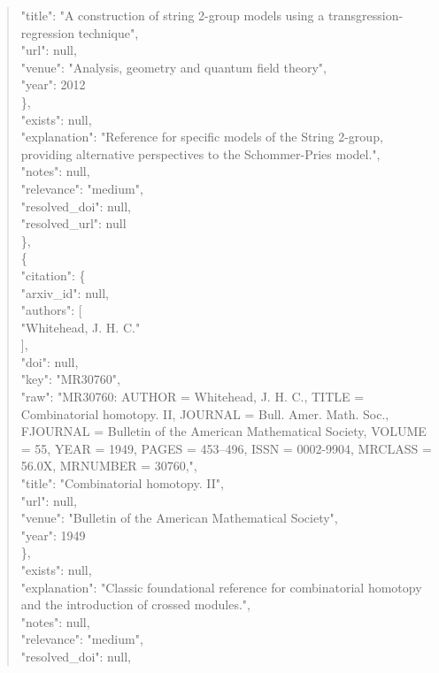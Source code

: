 \documentclass[11pt]{article}
\begin{document}
\begin{quote}
        "title": "A construction of string 2-group models using a transgression-regression technique",\\
        "url": null,\\
        "venue": "Analysis, geometry and quantum field theory",\\
        "year": 2012\\
      \},\\
      "exists": null,\\
      "explanation": "Reference for specific models of the String 2-group, providing alternative perspectives to the Schommer-Pries model.",\\
      "notes": null,\\
      "relevance": "medium",\\
      "resolved\_doi": null,\\
      "resolved\_url": null\\
    \},\\
    \{\\
      "citation": \{\\
        "arxiv\_id": null,\\
        "authors": [\\
          "Whitehead, J. H. C."\\
        ],\\
        "doi": null,\\
        "key": "MR30760",\\
        "raw": "MR30760: AUTHOR = Whitehead, J. H. C., TITLE = Combinatorial homotopy. II, JOURNAL = Bull. Amer. Math. Soc., FJOURNAL = Bulletin of the American Mathematical Society, VOLUME = 55, YEAR = 1949, PAGES = 453--496, ISSN = 0002-9904, MRCLASS = 56.0X, MRNUMBER = 30760,",\\
        "title": "Combinatorial homotopy. II",\\
        "url": null,\\
        "venue": "Bulletin of the American Mathematical Society",\\
        "year": 1949\\
      \},\\
      "exists": null,\\
      "explanation": "Classic foundational reference for combinatorial homotopy and the introduction of crossed modules.",\\
      "notes": null,\\
      "relevance": "medium",\\
      "resolved\_doi": null,\\

\end{quote}
\end{document}
